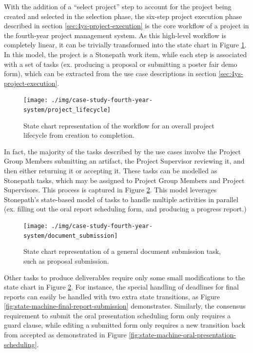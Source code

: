 With the addition of a ``select  project'' step to account for the project being created and selected in the selection phase, the six-step project execution phase described in section \ref{sec:4ys-project-execution} is the core workflow of a project in the fourth-year project management system. As this high-level workflow is completely linear, it can be trivially transformed into the state chart in Figure \ref{fig:state-machine-project-lifecycle}. In this model, the project is a Stonepath work item, while each step is associated with a set of tasks (ex. producing a proposal or submitting a poster fair demo form), which can be extracted from the use case descriptions in section \ref{sec:4ys-project-execution}.

\begin{figure}[!htbp]
\centering \texttt{[image: ./img/case-study-fourth-year-system/project\_lifecycle]}
\caption{State chart representation of the workflow for an overall project lifecycle from creation to completion.}
\label{fig:state-machine-project-lifecycle}
\end{figure}

In fact, the majority of the tasks described by the use cases involve the Project Group Members submitting an artifact, the Project Supervisor reviewing it, and then either returning it or accepting it. These tasks can be modelled as Stonepath tasks, which may be assigned to Project Group Members and Project Supervisors. This process is captured in Figure \ref{fig:state-machine-document-submission}. This model leverages Stonepath’s state-based model of tasks to handle multiple activities in parallel (ex. filling out the oral report scheduling form, and producing a progress report.)

\begin{figure}[!htbp]
\centering \texttt{[image: ./img/case-study-fourth-year-system/document\_submission]}
\caption{State chart representation of a general document submission task, such as proposal submission.}
\label{fig:state-machine-document-submission}
\end{figure}

Other tasks to produce deliverables require only some small modifications to the state chart in Figure \ref{fig:state-machine-document-submission}. For instance, the special handling of deadlines for final reports can easily be handled with two extra state transitions, as Figure \ref{fig:state-machine-final-report-submission} demonstrates. Similarly, the consensus requirement to submit the oral presentation scheduling form only requires a guard clause, while editing a submitted form only requires a new transition back from accepted as demonstrated in Figure \ref{fig:state-machine-oral-presentation-scheduling}.

